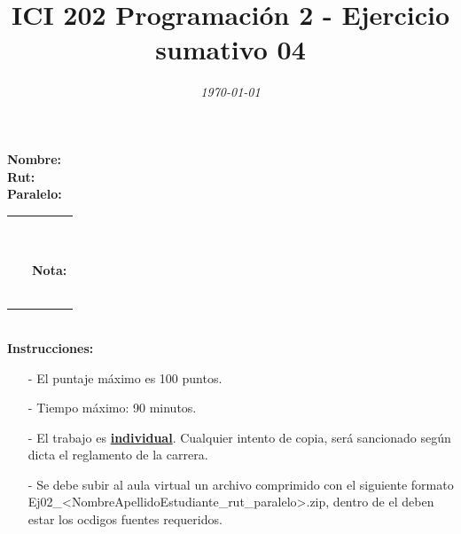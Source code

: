 \documentclass{exam}
\title{\LARGE\color{azul}\textbf{ICI 202 Programaci\'on 2 - Ejercicio sumativo 04 }}
\author{\normalsize \color{gray}{Prof.} \color{black}{\textbf{Ismael Figueroa, Eduardo Godoy}}}
\date{\normalsize \em \today}
\begin{document}

\maketitle

\begin{multicols}{2} \begin{flushleft} \textbf{Nombre:} \\ \vspace*{2mm} \textbf{Rut:} \\ \vspace*{2mm} \textbf{Paralelo:} \end{flushleft} \begin{center} \begin{table}[H] \begin{tabular}{p{4cm}|p{3cm}|} \arrayrulecolor{gray!50}\cline{2-2} ~ & {\em {\scriptsize \color{gray!50}{Puntaje:}}} \\ & ~ \\ ~ & \textbf{Nota:} \\ & ~ \\ \arrayrulecolor{gray!50}\cline{2-2} \end{tabular} \end{table} \end{center} \end{multicols}

\vspace*{-18mm}
\noindent
\textbf{\\Instrucciones:}
\begin{itemize}
    \item[-] El puntaje m\'aximo  es 100 puntos.
    \item[-] Tiempo m\'aximo: 90 minutos.
    \item[-] El trabajo es \underline{\textbf{individual}}. Cualquier intento de copia, ser\'a sancionado seg\'un dicta el reglamento de la carrera.
    \item[-] Se debe subir al aula virtual un archivo comprimido con el siguiente formato \\ Ej02\_<NombreApellidoEstudiante\_rut\_paralelo>.zip, dentro de el deben estar los ocdigos fuentes requeridos.
\end{itemize}
\end{document}
